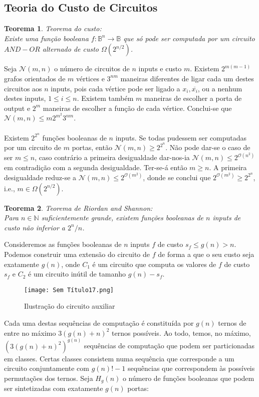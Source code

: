 \documentclass[10pt,a4paper]{report}
\newtheorem{theorem}{Teorema}
\begin{document}
\subsection{Teoria do Custo de Circuitos}
\begin{theorem} Teorema do custo:\\
Existe uma função booleana $f: \mathbb{B}^n \rightarrow \mathbb{B}$ que só pode ser computada por um circuito $AND-OR$ alternado de custo $\Omega(2^{n/2})$.
\end{theorem}
Seja $\mathcal{N}(m, n)$ o número de circuitos de $n$ inputs e custo $m$. Existem $2^{m(m-1)}$ grafos orientados de $m$ vértices e $3^{nm}$ maneiras diferentes de ligar cada um destes circuitos aos $n$ inputs, pois cada vértice pode ser ligado a $x_i, \overline{x_i}$, ou a nenhum destes inputs, $1 \leq i \leq n$. Existem também $m$ maneiras de escolher a porta de output e $2^m$ maneiras de escolher a função de cada vértice. Conclui-se que $\mathcal{N}(m,n) \leq m2^{m^2}3^{nm}$.\\
\\
Existem $2^{2^n}$ funções booleanas de $n$ inputs. Se todas pudessem ser computadas por um circuito de $m$ portas, então $\mathcal{N}(m,n) \geq 2^{2^n}$. Não pode dar-se o caso de ser $m \leq n$, caso contrário a primeira desigualdade dar-nos-ia $\mathcal{N}(m, n) \leq 2^{\mathcal{O}(n^2)}$ em contradição com a segunda desigualdade. Ter-se-á então $m \geq n$. A primeira desigualdade reduz-se a $\mathcal{N}(m, n) \leq 2^{\mathcal{O}(m^2)}$, donde se conclui que $2^{\mathcal{O}(m^2)} \geq 2^{2^n}$, i.e., $m \in \Omega(2^{n/2})$.
\begin{theorem} Teorema de Riordan and Shannon:\\
Para $n \in \mathbb{N}$ suficientemente grande, existem funções booleanas de $n$ inputs de custo não inferior a $2^n / n$.
\end{theorem}
Consideremos as funções booleanas de $n$ inputs $f$ de custo $s_f \leq g(n) > n$. Podemos construir uma extensão do circuito de $f$ de forma a que o seu custo seja exatamente $g(n)$, onde $C_1$ é um circuito que computa os valores de $f$ de custo $s_f$ e $C_2$ é um circuito inútil de tamanho $g(n)-s_f$.
\begin{figure}[H]
\centering
\texttt{[image: Sem Título17.png]}
\caption{Ilustração do circuito auxiliar}
\end{figure}
Cada uma destas sequências de computação é constituída por $g(n)$ ternos de entre no máximo $3(g(n) + n)^2$ ternos possíveis. Ao todo, temos, no máximo, $(3(g(n) + n)^2)^{g(n)}$ sequências de computação que podem ser particionadas em classes. Certas classes consistem numa sequência que corresponde a um circuito conjuntamente com $g(n)!-1$ sequências que correspondem às possíveis permutações dos ternos. Seja $H_g(n)$ o número de funções booleanas que podem ser sintetizadas com exatamente $g(n)$ portas:
\end{document}
